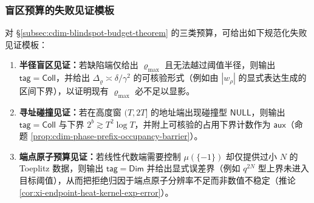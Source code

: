\subsubsection{盲区预算的失败见证模板}\label{subsubsec:cdim-failure-witness-templates}
对 \S\ref{subsec:cdim-blindspot-budget-theorem} 的三类预算，可给出如下规范化失败见证模板：
\begin{enumerate}
  \item \textbf{半径盲区见证：}若缺陷端仅给出 \(\varrho_{\max}\) 且无法越过阈值半径，则输出 \(\mathsf{tag}=\mathsf{Coll}\)，并给出 \(\Delta_{\varrho}\asymp \delta/\gamma^2\) 的可核验形式（例如由 \(|w_\rho|\) 的显式表达生成的区间下界），以证明现有 \(\varrho_{\max}\) 必不足以显影。
  \item \textbf{寻址碰撞见证：}若在高度窗 \((T,2T]\) 的地址端出现碰撞型 \(\mathsf{NULL}\)，则输出 \(\mathsf{tag}=\mathsf{Coll}\) 与下界 \(2^b\gtrsim T^2\log T\)，并附上可核验的占用下界计数作为 \(\mathsf{aux}\)（命题 \ref{prop:cdim-phase-prefix-occupancy-barrier}）。
  \item \textbf{端点原子预算见证：}若线性代数端需要控制 \(\mu(\{-1\})\) 却仅提供过小 \(N\) 的 Toeplitz 数据，则输出 \(\mathsf{tag}=\mathsf{Dim}\) 并给出显式误差界（例如 \(q^{2N}\) 型上界未进入目标阈值），从而把拒绝归因于端点原子分辨率不足而非数值不稳定（推论 \ref{cor:xi-endpoint-heat-kernel-exp-error}）。
\end{enumerate}


